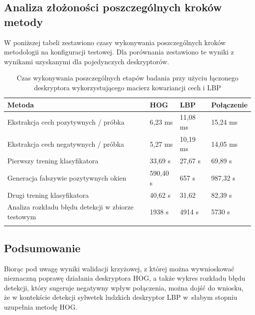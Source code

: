 \subsection{Analiza złożoności poszczególnych kroków metody}

W poniższej tabeli zestawiono czasy wykonywania poszczególnych kroków metodologii na konfiguracji testowej.
Dla porównania zestawiono te wyniki z wynikami uzyskanymi dla pojedynczych deskryptorów.

\begin{center}
    \begin{longtable}{ | p{5cm} | p{3cm} | p{3cm} | p{3cm} |}
    \hline
	Metoda & HOG & LBP & Połączenie \\ \hline
    Ekstrakcja cech pozytywnych / próbka & 6,23 ms & 11,08 ms & 15,24 ms \\ \hline
    Ekstrakcja cech negatywnych / próbka & 5,27 ms & 10,19 ms & 14,05 ms\\ \hline
    Pierwszy trening klasyfikatora & 33,69 s & 27,67 s & 69,89 s \\ \hline
    Generacja fałszywie pozytywnych okien & 590,40 s & 657 s & 987,32 s \\ \hline
    Drugi trening klasyfikatora & 40,62 s & 31,62 & 82,39 s \\ \hline
    Analiza rozkładu błędu detekcji w zbiorze testowym & 1938 s & 4914 s & 5730 s \\ \hline
    \caption{Czas wykonywania poszczególnych etapów badania przy użyciu łączonego deskryptora wykorzystującego macierz kowariancji cech i LBP} \\
    \end{longtable}
\end{center}

\subsection{Podsumowanie}
Biorąc pod uwagę wyniki walidacji krzyżowej, z której można wywnioskować nieznaczną poprawę działania deskryptora HOG, a także wykres rozkładu błędu detekcji, który sugeruje negatywny wpływ połączenia, można dojść do wniosku, że w kontekście detekcji sylwetek ludzkich deskryptor LBP w~słabym stopniu uzupełnia metodę HOG.